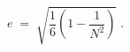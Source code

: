 \begin{equation}
e \; = \; \sqrt{ \frac{1}{6}{ \left( 1 - \frac{1}{N^2} \right) }} \; . 
\label{eq:a3} 
\end{equation}

